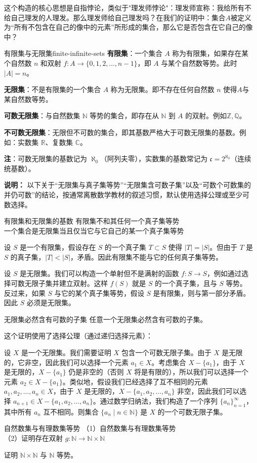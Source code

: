 这个构造的核心思想是自指悖论，类似于"理发师悖论"：理发师宣称：我给所有不给自己理发的人理发。那么理发师给自己理发吗？在我们的证明中：集合$A$被定义为“所有不包含在自己的像中的元素”所形成的集合，那么它是否包含在它自己的像中？
\begin{definition}{有限集与无限集}{finite-infinite-sets}
\textbf{有限集}：一个集合 $A$ 称为有限集，如果存在某个自然数 $n$ 和双射 $f: A \to \{0, 1, 2, \dots, n-1\}$，即 $A$ 与某个自然数等势。此时 $|A| = n$。

\textbf{无限集}：不是有限集的一个集合 $A$ 称为无限集。即不存在任何自然数 $n$ 使得$A$与某自然数等势。

\textbf{可数无限集}：与自然数集 $\mathbb{N}$ 等势的集合，即存在从 $\mathbb{N}$ 到 $A$ 的双射。例如$\mathbb{Z},\mathbb{Q}$。

\textbf{不可数无限集}：无限但不可数的集合，即其基数严格大于可数无限集的基数。例如：实数集 $\mathbb{R}$、复数集 $\mathbb{C}$。

\textbf{注}：可数无限集的基数记为 $\aleph_0$（阿列夫零），实数集的基数常记为 $\mathfrak{c}=2^{\aleph_0}$（连续统基数）。
\end{definition}
\noindent\textbf{说明：} 以下关于“无限集与真子集等势”“无限集含可数子集”以及“可数个可数集的并仍可数”的结论，按通常离散数学教材的叙述习惯，默认使用选择公理或至少可数选择。
\begin{theorem}{有限集和无限集的基数}{}
    有限集不和其任何一个真子集等势\\一个集合是无限集当且仅当它与它自己的某一个真子集等势
\end{theorem}
设 $S$ 是一个有限集，假设存在 $S$ 的一个真子集 $T \subset S$ 使得 $|T| = |S|$。但由于 $T$ 是 $S$ 的真子集，$|T| < |S|$，矛盾。因此有限集不能与它的任何真子集等势。

设 $S$ 是无限集。我们可以构造一个单射但不是满射的函数 $f: S \to S$，例如通过选择可数无限子集并建立双射。这样 $f(S)$ 就是 $S$ 的一个真子集，且与 $S$ 等势。反过来，如果 $S$ 与它的某个真子集等势，假设 $S$ 是有限集，则与第一部分矛盾。因此 $S$ 必须是无限集。
\begin{theorem}{无限集必然含有可数的子集}{}
    任意一个无限集必然含有可数的子集。
\end{theorem}
这个证明使用了选择公理（通过递归选择元素）：

设 $X$ 是一个无限集。我们需要证明 $X$ 包含一个可数无限子集。由于 $X$ 是无限的，它非空，因此我们可以选择一个元素 $a_1 \in X$。考虑集合 $X -\{a_1\}$，由于 $X$ 是无限的，$X - \{a_1\}$ 仍是非空的（否则 $X$ 将是有限的），所以我们可以选择一个元素 $a_2 \in X - \{a_1\}$。类似地，假设我们已经选择了互不相同的元素 $a_1, a_2, \dots, a_n \in X$，由于 $X$ 是无限的，$X- \{a_1, a_2, \dots, a_n\}$ 非空，因此我们可以选择 $a_{n+1} \in X-\{a_1, a_2, \dots, a_n\}$。通过数学归纳法，我们构造了一个序列 $\{a_n\}_{n=1}^\infty$，其中所有 $a_n$ 互不相同。则集合 $\{a_n \mid n \in \mathbb{N}\}$ 是 $X$ 的一个可数无限子集。
\begin{theorem}{自然数集与有理数集等势}{}
    （1）自然数集与有理数集等势\\ 
    （2）证明存在双射 $g: \mathbb{N} \to \mathbb{N} \times \mathbb{N}$
\end{theorem}
证明 $\mathbb{N} \times \mathbb{N}$ 与 $\mathbb{N}$ 等势。

